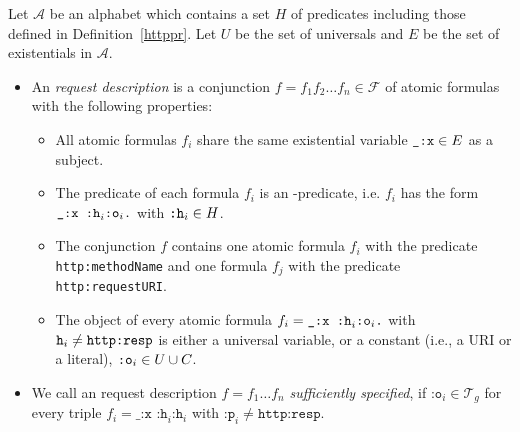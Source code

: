 \begin{definition}
  \label{def:HttpRequestDescription}
 Let $\mathcal{A}$ be an \nthree alphabet which contains a set $H$ of \http predicates including those defined in Definition~\ref{httppr}. Let $U$ be the set of universals and $E$ 
 be the set of existentials in $\mathcal{A}$. 
  \begin{itemize}
\item An \emph{\http request description} is a conjunction $f=f_1 f_2 \ldots f_n\in \mathcal{F}$ of atomic formulas with the following properties:
\begin{itemize}
 \item All atomic formulas $f_i$ share the same existential variable $\verb!_:x!\in E$ as a subject.
 \item The predicate of each formula $f_i$ is an \http-predicate, i.e. $f_i$ has the form $\verb!_:x :h!_i \verb!:o!_i\verb!.!$ with $\verb!:h!_i\in H$.
 \item The conjunction $f$ contains one atomic formula $f_i$ with the predicate\linebreak \verb! http:methodName!
 and one formula $f_j$ with the predicate\linebreak 
 \verb! http:requestURI!.
 \item The object of every atomic formula $f_i=\verb!_:x :h!_i \verb!:o!_i\verb!.!$ with $\verb!h!_i \neq \verb!http:resp!$ is either a universal variable, 
 or a constant  (i.e., a URI or a literal), $\verb!:o!_i\in U\cup C$.
\end{itemize}

%  
\item  We call an \http request description $f=f_1\ldots f_n$ \textit{sufficiently specified},
if  $\texttt{:o}_i\in \mathcal{T}_g$ for every triple $f_i=\texttt{\_:x :h}_i \texttt{:h}_i$ with $\texttt{:p}_i\neq \texttt{http:resp}$. %
\end{itemize}

\end{definition}


